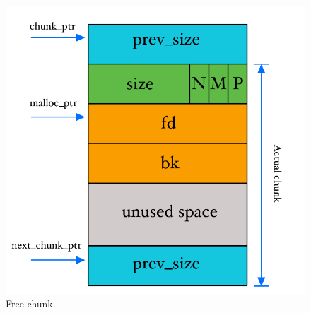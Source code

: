 \documentclass{article}
\numberwithin{equation}{subsection}
\begin{document}
\begin{figure}[H]
\begin{minipage}[b]{0.5\textwidth}
    \includegraphics[width=\textwidth]{free_chunk.pdf}
    \caption{Free chunk.}
    \label{fig:free_chunk}
  \end{minipage}
\end{figure}
\end{document}
